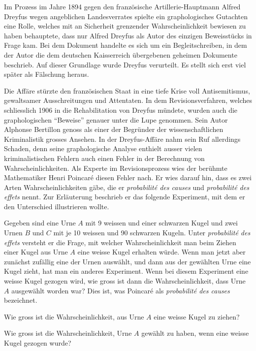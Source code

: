 Im Prozess im Jahre 1894 gegen den französische Artillerie-Hauptmann
Alfred Dreyfus wegen
angeblichen Landesverrates spielte ein graphologisches Gutachten eine
Rolle, welches mit an Sicherheit grenzender Wahrscheinlichkeit bewiesen
zu haben behauptete, dass nur Alfred Dreyfus als Autor des einzigen
Beweisstücks in Frage kam.
Bei dem Dokument handelte es sich um ein Begleitschreiben, in dem der
Autor die dem deutschen Kaisserreich übergebenen geheimen Dokumente
beschrieb.
Auf dieser Grundlage wurde Dreyfus verurteilt.
Es stellt sich erst viel später als Fälschung heraus.

Die Affäre stürzte den französischen Staat in eine tiefe Krise
voll Antisemitismus, gewaltsamer Ausschreitungen und Attentaten.
In dem Revisionsverfahren, welches schliesslich 1906 in die Rehabilitation
von Dreyfus mündete, wurden auch die graphologischen ``Beweise''
genauer unter die Lupe genommen.
Sein Autor Alphonse Bertillon genoss als einer der Begründer
der wissenschaftlichen
Kriminalistik grosses Ansehen. In der Dreyfus-Affäre nahm sein Ruf
allerdings Schaden, denn seine graphologische Analyse enthielt
ausser vielen kriminalistischen Fehlern auch einen Fehler in der
Berechnung von Wahrscheinlichkeiten.
Als Experte im Revisionsprozess wies der berühmte Mathematiker
Henri Poincar\'e diesen Fehler nach.
Er wies darauf hin, dass es zwei Arten Wahrscheinlichkeiten gäbe,
die er {\it probabilit\'e des causes} und {\it probabilit\'e des effets}
nennt.
Zur Erläuterung beschrieb er das folgende Experiment, mit
dem er den Unterschied illustrieren wollte. 

Gegeben sind eine Urne $A$ mit 9 weissen und einer schwarzen Kugel
und zwei Urnen $B$ und $C$ mit je 10 weissen und 90 schwarzen Kugeln.
Unter {\it probabilit\'e des effets} versteht er die Frage, mit welcher
Wahrscheinlichkeit man beim Ziehen einer Kugel aus Urne $A$ eine
weisse Kugel erhalten würde.
Wenn man jetzt aber zunächst zufällig eine der Urnen auswählt, und dann
aus der gewählten Urne eine Kugel zieht, hat man ein anderes
Experiment. 
Wenn bei diesem Experiment eine weisse Kugel gezogen wird, wie gross
ist dann die Wahrscheinlichkeit, dass Urne $A$ ausgewählt worden war?
Dies ist, was Poincar\'e als {\it probabilit\'e des causes} bezeichnet.

\begin{teilaufgaben}
\item Wie gross ist die Wahrscheinlichkeit, aus Urne $A$ eine weisse Kugel
zu ziehen?
\item Wie gross ist die Wahrscheinlichkeit, Urne $A$ gewählt zu haben,
wenn eine weisse Kugel gezogen wurde?
\end{teilaufgaben}


